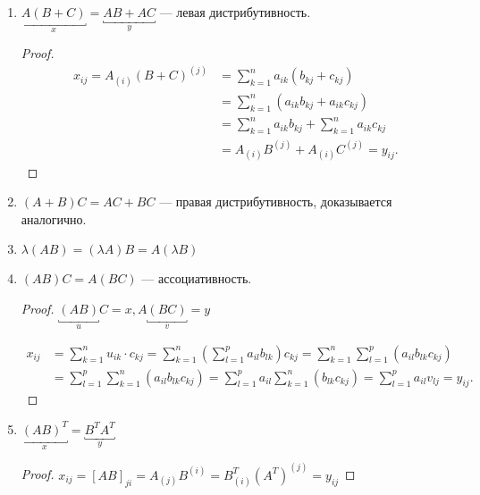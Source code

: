 \begin{enumerate}
\item 
    $\underbracket{A(B + C)}_x = \underbracket{AB + AC}_y$ --- левая дистрибутивность.
   
    \begin{proof}
        \begin{align*}
            x_{ij} = A_{(i)} (B + C)^{(j)} 
            &= \sum_{k = 1}^{n} a_{ik} (b_{kj} + c_{kj}) \\
            &= \sum_{k = 1}^{n} (a_{ik} b_{kj} + a_{ik} c_{kj}) \\
            &= \sum_{k = 1}^{n} a_{ik} b_{kj} + \sum_{k = 1}^{n} a_{ik} c_{kj} \\
            &= A_{(i)} B^{(j)} + A_{(i)} C^{(j)} = y_{ij}
        .\end{align*}
    \end{proof}

\item $(A+B)C = AC + BC$ --- правая дистрибутивность, доказывается аналогично.

\item $\lambda(AB) = (\lambda A) B = A (\lambda B)$

\item $(AB)C = A(BC)$ --- ассоциативность.

    \begin{proof}
        $\underbracket{(AB)}_u C = x, A\underbracket{(BC)}_v = y$

        \begin{align*}
            x_{ij} 
            &= \sum_{k = 1}^{n} u_{ik} \cdot c_{kj}
            = \sum_{k = 1}^{n} \left(\sum_{l = 1}^{p} a_{il} b_{lk}\right) c_{kj}
            = \sum_{k = 1}^{n} \sum_{l = 1}^{p} \left(a_{il} b_{lk} c_{kj}\right) \\
            &= \sum_{l = 1}^{p} \sum_{k = 1}^{n} \left(a_{il} b_{lk} c_{kj}\right)
            = \sum_{l = 1}^{p} a_{il} \sum_{k = 1}^{n} \left(b_{lk} c_{kj}\right)
            = \sum_{l = 1}^{p} a_{il} v_{lj} = y_{ij}
        .\end{align*}
    \end{proof}

\item 
    $\underbracket{(AB)^T}_x = \underbracket{B^T A^T}_y$
   
    \begin{proof}
            $x_{ij} = [AB]_{ji} = A_{(j)} B^{(i)} = B^T_{(i)} (A^T)^{(j)} = y_{ij}$
    \end{proof}
\end{enumerate}

